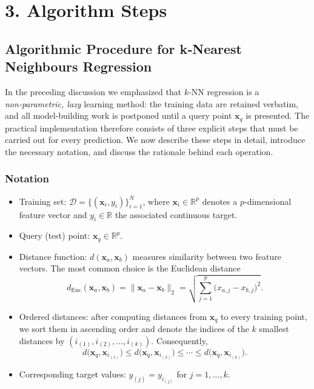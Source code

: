\documentclass[12pt, a4paper]{article}
\begin{document}
\newpage

\section{3. Algorithm Steps}
\subsection{Algorithmic Procedure for k‑Nearest Neighbours Regression}
In the preceding discussion we emphasized that \(k\)-NN regression is a \emph{non‑parametric, lazy} learning method: the training data are retained verbatim, and all model‑building work is postponed until a query point \(\mathbf{x}_q\) is presented.  
The practical implementation therefore consists of three explicit steps that must be carried out for every prediction.  We now describe these steps in detail, introduce the necessary notation, and discuss the rationale behind each operation.

\subsubsection{Notation}
\begin{itemize}
    \item Training set: \(\mathcal{D}=\{(\mathbf{x}_i, y_i)\}_{i=1}^{N}\), where \(\mathbf{x}_i\in\mathbb{R}^{p}\) denotes a \(p\)-dimensional feature vector and \(y_i\in\mathbb{R}\) the associated continuous target.
    \item Query (test) point: \(\mathbf{x}_q\in\mathbb{R}^{p}\).
    \item Distance function: \(d(\mathbf{x}_a,\mathbf{x}_b)\) measures similarity between two feature vectors.  The most common choice is the Euclidean distance
    \[
    d_{\text{Euc}}(\mathbf{x}_a,\mathbf{x}_b)=\big\|\mathbf{x}_a-\mathbf{x}_b\big\|_2
    =\sqrt{\sum_{j=1}^{p}\big(x_{a,j}-x_{b,j}\big)^{2}} .
    \]
    \item Ordered distances: after computing distances from \(\mathbf{x}_q\) to every training point, we sort them in ascending order and denote the indices of the \(k\) smallest distances by \((i_{(1)}, i_{(2)},\ldots,i_{(k)})\).  Consequently,
    \[
    d\big(\mathbf{x}_q,\mathbf{x}_{i_{(1)}}\big)\le d\big(\mathbf{x}_q,\mathbf{x}_{i_{(2)}}\big)\le\cdots\le d\big(\mathbf{x}_q,\mathbf{x}_{i_{(k)}}\big).
    \]
    \item Corresponding target values: \(y_{(j)} = y_{i_{(j)}}\) for \(j=1,\dots,k\).
\end{itemize}
\end{document}
